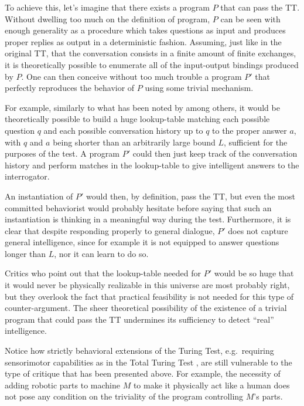 \documentclass{article}
\begin{document}
To achieve this, let's imagine that there exists a program \(P\) that can pass the TT. Without dwelling too much on the definition of program, \(P\) can be seen with enough generality as a procedure which takes questions as input and produces proper replies as output in a deterministic fashion. Assuming, just like in the original TT, that the conversation consists in a finite amount of finite exchanges, it is theoretically possible to enumerate all of the input-output bindings produced by \(P\). One can then conceive without too much trouble a program \(P'\) that perfectly reproduces the behavior of \(P\) using some trivial mechanism.

For example, similarly to what has been noted by \cite{block1981psychologism} among others, it would be theoretically possible to build a huge lookup-table matching each possible question \(q\) and each possible conversation history up to \(q\) to the proper answer \(a\), with \(q\) and \(a\) being shorter than an arbitrarily large bound \(L\), sufficient for the purposes of the test. A program \(P'\) could then just keep track of the conversation history and perform matches in the lookup-table to give intelligent answers to the interrogator.

An instantiation of \(P'\) would then, by definition, pass the TT, but even the most committed behaviorist would probably hesitate before saying that such an instantiation is thinking in a meaningful way during the test. Furthermore, it is clear that despite responding properly to general dialogue, \(P'\) does not capture general intelligence, since for example it is not equipped to answer questions longer than \(L\), nor it can learn to do so.

Critics who point out that the lookup-table needed for \(P'\) would be so huge that it would never be physically realizable in this universe are most probably right, but they overlook the fact that practical feasibility is not needed for this type of counter-argument. The sheer theoretical possibility of the existence of a trivial program that could pass the TT undermines its sufficiency to detect ``real'' intelligence.

Notice how strictly behavioral extensions of the Turing Test, e.g.~requiring sensorimotor capabilities as in the Total Turing Test \citep{harnad1991other}, are still vulnerable to the type of critique that has been presented above. For example, the necessity of adding robotic parts to machine \(M\) to make it physically act like a human does not pose any condition on the triviality of the program controlling \(M\)'s parts.
\end{document}
